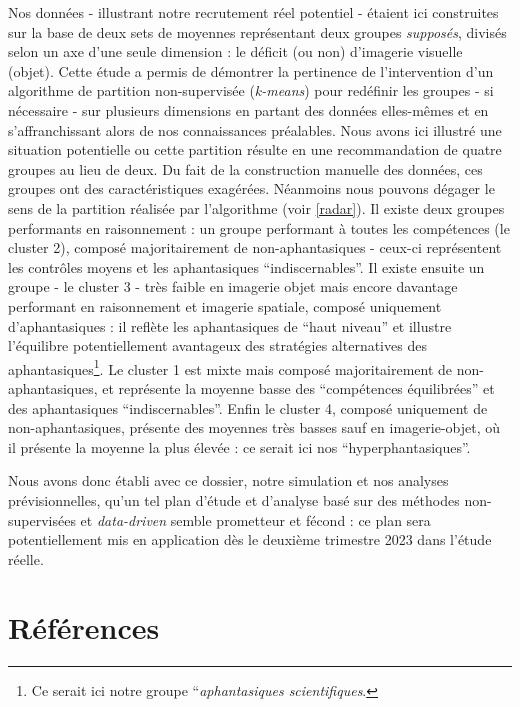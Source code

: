 \documentclass[
  12pt,
]{article}
\begin{document}
Nos données - illustrant notre recrutement réel potentiel - étaient ici
construites sur la base de deux sets de moyennes représentant deux
groupes \emph{supposés}, divisés selon un axe d'une seule dimension : le
déficit (ou non) d'imagerie visuelle (objet). Cette étude a permis de
démontrer la pertinence de l'intervention d'un algorithme de partition
non-supervisée (\emph{k-means}) pour redéfinir les groupes - si
nécessaire - sur plusieurs dimensions en partant des données elles-mêmes
et en s'affranchissant alors de nos connaissances préalables. Nous avons
ici illustré une situation potentielle ou cette partition résulte en une
recommandation de quatre groupes au lieu de deux. Du fait de la
construction manuelle des données, ces groupes ont des caractéristiques
exagérées. Néanmoins nous pouvons dégager le sens de la partition
réalisée par l'algorithme (voir \autoref{radar}). Il existe deux groupes
performants en raisonnement : un groupe performant à toutes les
compétences (le cluster 2), composé majoritairement de non-aphantasiques
- ceux-ci représentent les contrôles moyens et les aphantasiques
``indiscernables''. Il existe ensuite un groupe - le cluster 3 - très
faible en imagerie objet mais encore davantage performant en
raisonnement et imagerie spatiale, composé uniquement d'aphantasiques :
il reflète les aphantasiques de ``haut niveau'' et illustre l'équilibre
potentiellement avantageux des stratégies alternatives des
aphantasiques\footnote{Ce serait ici notre groupe ``\emph{aphantasiques
  scientifiques}.}. Le cluster 1 est mixte mais composé majoritairement
de non-aphantasiques, et représente la moyenne basse des ``compétences
équilibrées'' et des aphantasiques ``indiscernables''. Enfin le cluster
4, composé uniquement de non-aphantasiques, présente des moyennes très
basses sauf en imagerie-objet, où il présente la moyenne la plus élevée
: ce serait ici nos ``hyperphantasiques''.

Nous avons donc établi avec ce dossier, notre simulation et nos analyses
prévisionnelles, qu'un tel plan d'étude et d'analyse basé sur des
méthodes non-supervisées et \emph{data-driven} semble prometteur et
fécond : ce plan sera potentiellement mis en application dès le deuxième
trimestre 2023 dans l'étude réelle.

\newpage

\hypertarget{ruxe9fuxe9rences}{%
\section*{Références}\label{ruxe9fuxe9rences}}
\end{document}
